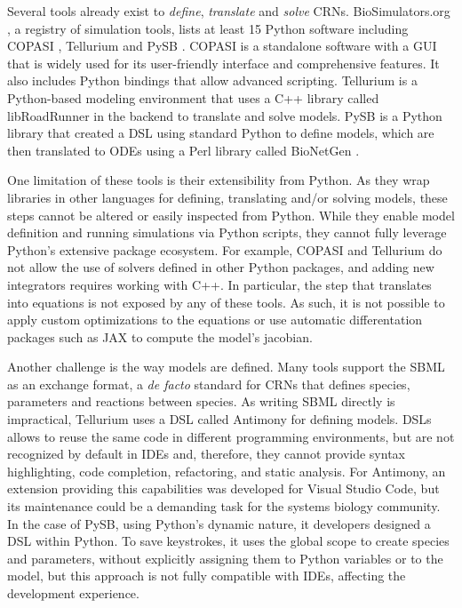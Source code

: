 \documentclass{article}
\begin{document}
Several tools already exist to \emph{define}, \emph{translate} and \emph{solve} \acp{CRN}.
BioSimulators.org \cite{shaikhBioSimulatorsCentralRegistry2022},
a registry of simulation tools,
lists at least 15 Python software including
COPASI \cite{hoopsCOPASICOmplexPAthway2006},
Tellurium \cite{choiTelluriumExtensiblePythonbased2018} and
PySB \cite{lopezProgrammingBiologicalModels2013}.
COPASI is a standalone software with a \ac{GUI}
that is widely used for its user-friendly interface and comprehensive features.
It also includes Python bindings \cite{bergmannBASICOSimplifiedPython2023b} that allow advanced scripting.
Tellurium is a Python-based modeling environment
that uses a C++ library called libRoadRunner in the backend to translate and solve models.
PySB is a Python library that created a \ac{DSL} using standard Python to define models,
which are then translated to \acp{ODE} using a Perl library called BioNetGen \cite{harrisBioNetGenAdvancesRulebased2016}.

One limitation of these tools is their extensibility from Python.
As they wrap libraries in other languages for defining, translating and/or solving models,
these steps cannot be altered or easily inspected from Python.
While they enable model definition and running simulations via Python scripts,
they cannot fully leverage Python's extensive package ecosystem.
For example,
COPASI and Tellurium do not allow the use of solvers defined in other Python packages,
and adding new integrators requires working with C++.
In particular, the step that translates into equations is not exposed by any of these tools.
As such, it is not possible to apply custom optimizations to the equations
or use automatic differentation packages such as JAX \cite{jax2018github} to compute the model's jacobian.



Another challenge is the way models are defined.
Many tools support the \ac{SBML} \cite{huckaSBMLL3V2} as an exchange format,
a \emph{de facto} standard for \acp{CRN} that defines species, parameters and reactions between species.
As writing \ac{SBML} directly is impractical,
Tellurium uses a \ac{DSL} called Antimony \cite{smithAntimonyModularModel2009} for defining models.
\Acp{DSL} allows to reuse the same code in different programming environments,
but are not recognized by default in \acp{IDE}
and, therefore, they cannot provide syntax highlighting, code completion, refactoring, and static analysis.
For Antimony, an extension providing this capabilities was developed for Visual Studio Code,
but its maintenance could be a demanding task for the systems biology community.
In the case of PySB,
using Python's dynamic nature,
it developers designed a \ac{DSL} within Python.
To save keystrokes,
it uses the global scope to create species and parameters,
without explicitly assigning them to Python variables or to the model,
but this approach is not fully compatible with \acp{IDE},
affecting the development experience.
\end{document}
